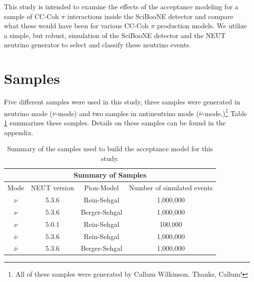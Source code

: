 \documentclass[11pt]{article}
\begin{document}
This study is intended to examine the effects of the acceptance modeling for a sample of CC-Coh $\pi$ interactions inside the SciBooNE detector and compare what these would have been for various CC-Coh $\pi$ production models. We utilize a simple, but robust, simulation of the SciBooNE detector and the NEUT neutrino generator to select and classify these neutrino events.



\section{Samples}
\label{sec:samples}
Five different samples were used in this study, three samples were generated in neutrino mode ($\nu$-mode) and two samples in antineutrino mode ($\bar{\nu}$-mode.)\footnote{All of these samples were generated by Callum Wilkinson. Thanks, Callum!} Table \ref*{tab:samples} summarizes these samples. Details on these samples can be found in the appendix.

\begin{center}
\begin{table}[htb]
	\begin{center}
	\begin{tabular}{c|c|c|c}
	\multicolumn{4}{c}{\textbf{Summary of Samples}} \\
	\hline \hline
	 Mode & NEUT version & Pion-Model & Number of simulated events\\
	\hline
	 $\nu$ & 5.3.6 & Rein-Sehgal & 1,000,000 \\
	\hline
	$\nu$ & 5.3.6 & Berger-Sehgal & 1,000,000 \\
	\hline
	$\nu$ & 5.0.1 & Rein-Sehgal & 100,000 \\
	\hline
	 $\bar{\nu}$ & 5.3.6 & Rein-Sehgal & 1,000,000 \\
	\hline
	$\bar{\nu}$ & 5.3.6 & Berger-Sehgal & 1,000,000 \\
	\hline
	\end{tabular}%
	\caption{Summary of the samples used to build the acceptance model for this study.}
	\label{tab:samples}
	\end{center}
\end{table}
\end{center}



\end{document}
